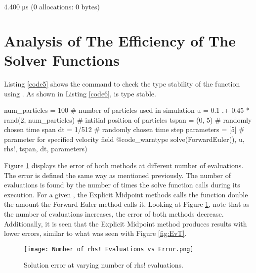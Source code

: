 \documentclass{article}
\begin{document}
{\LARGE
\begin{jllisting}[caption={Type stable check output.}, label=code4]
4.400 μs (0 allocations: 0 bytes)
\end{jllisting}
}

\section{Analysis of The Efficiency of The Solver Functions}

Listing \ref{code5} shows the command to check the type stability of the  function using . As shown in Listing \ref{code6},  is type stable.

{\LARGE
\begin{jllisting}[caption={Type stable check command.}, label=code5]
num_particles = 100 # number of particles used in simulation
u = 0.1 .+ 0.45 * rand(2, num_particles) # intitial position of particles
tspan = (0, 5) # randomly chosen time span
dt = 1/512 # randomly chosen time step
parameters = [5] # parameter for specified velocity field
@code_warntype solve(ForwardEuler(), u, rhs!, tspan, dt, parameters)
\end{jllisting}
}

{\LARGE
{}
}

Figure \ref{fig:EvN} displays the error of both methods at different number of  evaluations. The error is defined the same way as mentioned previously. The number of  evaluations is found by the number of times the solve function calls  during its execution. For a given , the Explicit Midpoint methods calls the  function double the amount the Forward Euler method calls it. Looking at Figure \ref{fig:EvN}, note that as the number of  evaluations increases, the error of both methods decrease. Additionally, it is seen that the Explicit Midpoint method produces results with lower errors, similar to what was seen with Figure \ref{fig:EvT}.

\begin{figure}[h!]
  \centering
  \texttt{[image: Number of rhs! Evaluations vs Error.png]}
  \caption{Solution error at varying number of rhs! evaluations.}
  \label{fig:EvN}
\end{figure}
\end{document}
